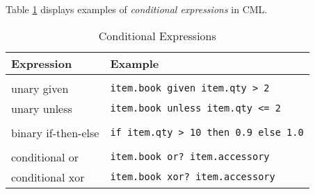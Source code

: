 Table \ref{tab:conditional-expr-examples} displays examples of
\emph{conditional expressions} in CML.

\begin{table}[H]
\centering
\begin{tabular}
{ l l }
\hline
Expression & Example \\
\hline
\\
unary given & \verb|item.book given item.qty > 2| \\
unary unless & \verb|item.book unless item.qty <= 2| \\
\\
binary if-then-else & \verb|if item.qty > 10 then 0.9 else 1.0| \\
\\
conditional or & \verb|item.book or? item.accessory| \\
conditional xor & \verb|item.book xor? item.accessory| \\
\end{tabular}
\caption{Conditional Expressions}
\label{tab:conditional-expr-examples}
\end{table}
